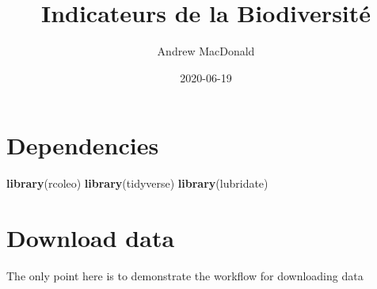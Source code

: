 \documentclass[]{book}
\title{Indicateurs de la Biodiversité}
\author{Andrew MacDonald}
\date{2020-06-19}
\newenvironment{Shaded}{\begin{snugshade}}{\end{snugshade}}
\newcommand{\KeywordTok}[1]{\textcolor[rgb]{0.13,0.29,0.53}{\textbf{#1}}}
\newcommand{\NormalTok}[1]{#1}
\begin{document}
\maketitle

{
\setcounter{tocdepth}{1}
\tableofcontents
}
\hypertarget{dependencies}{%
\chapter{Dependencies}\label{dependencies}}

\begin{Shaded}
\begin{Highlighting}[]
\KeywordTok{library}\NormalTok{(rcoleo)}
\KeywordTok{library}\NormalTok{(tidyverse)}
\KeywordTok{library}\NormalTok{(lubridate)}
\end{Highlighting}
\end{Shaded}

\hypertarget{dl}{%
\chapter{Download data}\label{dl}}

The only point here is to demonstrate the workflow for downloading data
\end{document}
